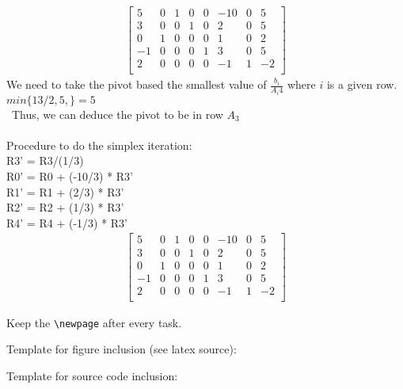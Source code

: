 \documentclass[a4paper,10pt]{article}
\begin{document}
\begin{align}
\begin{bmatrix}
5 & 0 & 1 & 0 & 0 & -10 & 0 & 5\\
3 & 0 & 0 & 1 & 0 & 2 & 0 & 5\\
0 & 1 & 0 & 0 & 0 & 1 & 0 & 2\\
-1 & 0 & 0 & 0 & 1 & 3 & 0 & 5\\
2 & 0 & 0 & 0 & 0 & -1 & 1 & -2\\
\end{bmatrix}
\end{align}
We need to take the pivot based the smallest value of $\frac{b_i}{A_i4}$ where $i$ is a given row.\\
$min\{
13/2,
5,
\} = 5$\\\ 
Thus, we can deduce the pivot to be in row $A_3$\\\\
Procedure to do the simplex iteration: \\
R3'  = R3/(1/3) \\
R0' = R0 + (-10/3) * R3' \\
R1' = R1 + (2/3) * R3' \\
R2' = R2 + (1/3) * R3' \\
R4' = R4 + (-1/3) * R3' \\

\begin{align}
\begin{bmatrix}
5 & 0 & 1 & 0 & 0 & -10 & 0 & 5\\
3 & 0 & 0 & 1 & 0 & 2 & 0 & 5\\
0 & 1 & 0 & 0 & 0 & 1 & 0 & 2\\
-1 & 0 & 0 & 0 & 1 & 3 & 0 & 5\\
2 & 0 & 0 & 0 & 0 & -1 & 1 & -2\\
\end{bmatrix}
\end{align}



Keep the \verb=\newpage= after every task.

\bigskip
\bigskip
Template for figure inclusion (see latex source):

\begin{figure}[htb]
\begin{center}
\end{center}
\end{figure}


\bigskip
\bigskip
Template for source code inclusion:
\end{document}
